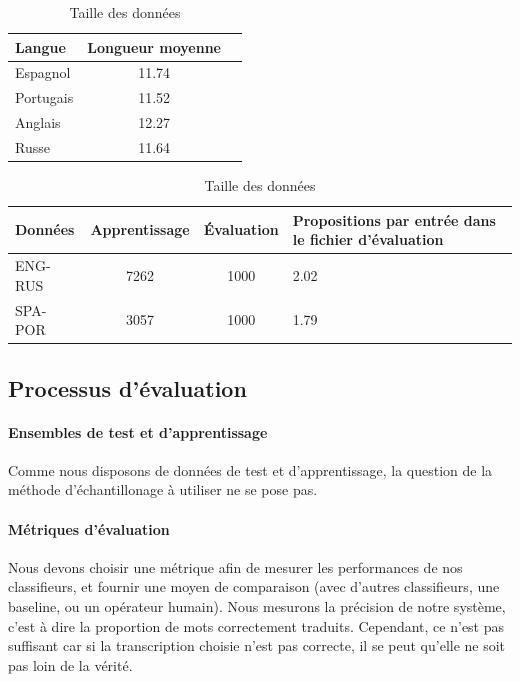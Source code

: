 \documentclass{article}
\begin{document}
\begin{table}[H]
\caption{Longueur moyenne des mots dans les données}
\label{table_len}
\label{table1}
\begin{center}
\begin{tabular}{|l|c|c|}
\hline
Langue&Longueur moyenne\\
\hline
Espagnol&11.74\\
\hline
Portugais&11.52\\
\hline
\hline
Anglais&12.27\\
\hline
Russe&11.64\\
\hline
\end{tabular}
\end{center}

\caption{Taille des données}
\label{table2}
\begin{center}
    \begin{tabular}{|l|c|c|p{4cm}|}
\hline
Données&Apprentissage&Évaluation&Propositions par entrée dans le fichier d'évaluation\\
\hline
ENG-RUS&7262&1000&2.02\\
\hline
SPA-POR&3057&1000&1.79\\
\hline
\end{tabular}
\end{center}

\end{table}


\subsection{Processus d'évaluation}
\label{eval}
\paragraph{Ensembles de test et d'apprentissage}
Comme nous disposons de données de test et d'apprentissage, la question de la méthode d'échantillonage à utiliser ne se pose pas.

\paragraph{Métriques d'évaluation}
Nous devons choisir une métrique afin de mesurer les performances de nos classifieurs, et fournir une moyen de comparaison (avec d'autres classifieurs, une baseline, ou un opérateur humain).
Nous mesurons la précision de notre système, c'est à dire la proportion de mots correctement traduits. Cependant, ce n'est pas suffisant car si la transcription choisie n'est pas correcte, il se peut qu'elle ne soit pas loin de la vérité.
\end{document}
